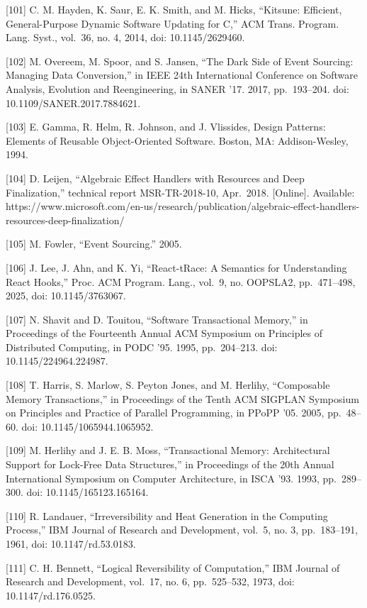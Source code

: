 {[}101{]} C. M. Hayden, K. Saur, E. K. Smith, and M. Hicks, ``Kitsune: Efficient,
General-Purpose Dynamic Software Updating for C,'' ACM Trans. Program. Lang. Syst.,
vol.~36, no. 4, 2014, doi: 10.1145/2629460.

{[}102{]} M. Overeem, M. Spoor, and S. Jansen, ``The Dark Side of Event Sourcing:
Managing Data Conversion,'' in IEEE 24th International Conference on Software
Analysis, Evolution and Reengineering, in SANER '17. 2017, pp.~193--204. doi:
10.1109/SANER.2017.7884621.

{[}103{]} E. Gamma, R. Helm, R. Johnson, and J. Vlissides, Design Patterns: Elements
of Reusable Object-Oriented Software. Boston, MA: Addison-Wesley, 1994.

{[}104{]} D. Leijen, ``Algebraic Effect Handlers with Resources and Deep
Finalization,'' technical report MSR-TR-2018-10, Apr.~2018. {[}Online{]}. Available:
https://www.microsoft.com/en-us/research/publication/algebraic-effect-handlers-resources-deep-finalization/

{[}105{]} M. Fowler, ``Event Sourcing.'' 2005.

{[}106{]} J. Lee, J. Ahn, and K. Yi, ``React-tRace: A Semantics for Understanding
React Hooks,'' Proc. ACM Program. Lang., vol.~9, no. OOPSLA2, pp.~471--498, 2025,
doi: 10.1145/3763067.

{[}107{]} N. Shavit and D. Touitou, ``Software Transactional Memory,'' in
Proceedings of the Fourteenth Annual ACM Symposium on Principles of Distributed
Computing, in PODC '95. 1995, pp.~204--213. doi: 10.1145/224964.224987.

{[}108{]} T. Harris, S. Marlow, S. Peyton Jones, and M. Herlihy, ``Composable Memory
Transactions,'' in Proceedings of the Tenth ACM SIGPLAN Symposium on Principles and
Practice of Parallel Programming, in PPoPP '05. 2005, pp.~48--60. doi:
10.1145/1065944.1065952.

{[}109{]} M. Herlihy and J. E. B. Moss, ``Transactional Memory: Architectural
Support for Lock-Free Data Structures,'' in Proceedings of the 20th Annual
International Symposium on Computer Architecture, in ISCA '93. 1993, pp.~289--300.
doi: 10.1145/165123.165164.

{[}110{]} R. Landauer, ``Irreversibility and Heat Generation in the Computing
Process,'' IBM Journal of Research and Development, vol.~5, no. 3, pp.~183--191,
1961, doi: 10.1147/rd.53.0183.

{[}111{]} C. H. Bennett, ``Logical Reversibility of Computation,'' IBM Journal of
Research and Development, vol.~17, no. 6, pp.~525--532, 1973, doi: 10.1147/rd.176.0525.


